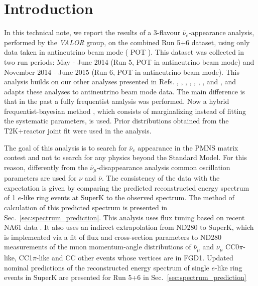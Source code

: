 
\section {Introduction}
\label{sec:intro}

In this technical note, we report the results of a 3-flavour $\bar{\nu}_{e}$-appearance analysis,
performed by the {\em VALOR} group,        
on the combined Run 5+6 dataset, using only data taken in antineutrino beam mode (
\TotalPot{} POT
).
This dataset was collected in two run periods:
May - June 2014 (Run 5, \RunVPot{} POT in antineutrino beam mode) and November 2014 - June 2015 
(Run 6, 
\RunVIPot{} 
POT in antineutrino beam mode).
This analysis builds on our other analyses presented in Refs. 
\cite{OurRun1DisappAnalysis},
\cite{OurRun12DisappAnalysis}, 
\cite{OurRun12DisappAnalysis3Flavour},
\cite{OurRun123DisappAnalysis3Flavour},
\cite{OurRun1234aDisappAnalysis3Flavour},
\cite{OurRun1234DisappAnalysis3Flavour},
\cite{OurRun123JointOscillationAnalysis},
\cite{OurRun1234JointOscillationAnalysis} and
\cite{OurRun56AntiNumuDisappearanceAnalysis3Flavour}
, and adapts these analyses  
to antineutrino beam mode data.
The main difference is that in the past a fully frequentist analysis was performed.
Now a hybrid frequentist-bayesian method \cite{CousinsHighland}, 
which consists of marginalizing instead of fitting 
the systematic parameters, is used.
Prior distributions obtained from the T2K+reactor joint fit 
\cite{Mach3JointFitRun14} were used in the analysis.

The goal of this analysis is to search for $\bar{\nu}_e$ appearance in the PMNS matrix contest
and not to search for any physics beyond the Standard Model.
For this reason, differently from the $\bar{\nu}_{\mu}$-disappearance analysis \cite{OurRun56AntiNumuDisappearanceAnalysis3Flavour}
common oscillation parameters are used for $\nu$ and $\bar{\nu}$.
The consistency of the data with the expectation is given by comparing the predicted reconstructed energy spectrum of 1 $e$-like ring 
events at SuperK to the observed spectrum. The method of calculation of this predicted spectrum is presented in Sec.~\ref{sec:spectrum_prediction}.
This analysis uses flux tuning based on recent NA61 data \cite{FluxTuning}\cite{NA61T2K}. 
It also uses an indirect extrapolation from ND280 to SuperK, which is implemented via a fit of flux and cross-section parameters to
ND280 measurements of the muon momentum-angle distributions of $\bar{\nu}_\mu$ and  $\nu_\mu$
CC0$\pi$-like, CC1$\pi$-like and CC other events whose 
vertices are in FGD1\cite{BANFF2015}.
Updated nominal predictions of the reconstructed energy spectrum of single $e$-like ring events in SuperK are presented for Run 5+6
in Sec.~\ref{sec:spectrum_prediction}

